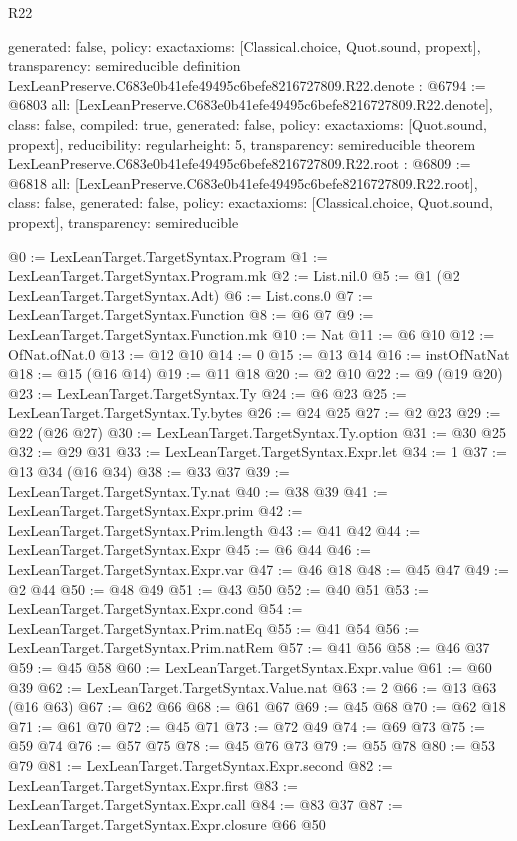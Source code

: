\begin{lexlean}{R22}
\begin{coremodule}
{  generated: false,
  policy: exact{axioms: [Classical.choice, Quot.sound, propext]},
  transparency: semireducible
}
definition LexLeanPreserve.C683e0b41efe49495c6befe8216727809.R22.denote : @6794 := @6803 {
  all: [LexLeanPreserve.C683e0b41efe49495c6befe8216727809.R22.denote],
  class: false,
  compiled: true,
  generated: false,
  policy: exact{axioms: [Quot.sound, propext]},
  reducibility: regular{height: 5},
  transparency: semireducible
}
theorem LexLeanPreserve.C683e0b41efe49495c6befe8216727809.R22.root : @6809 := @6818 {
  all: [LexLeanPreserve.C683e0b41efe49495c6befe8216727809.R22.root],
  class: false,
  generated: false,
  policy: exact{axioms: [Classical.choice, Quot.sound, propext]},
  transparency: semireducible
}

@0 := LexLeanTarget.TargetSyntax.Program
@1 := LexLeanTarget.TargetSyntax.Program.mk
@2 := List.nil.{0}
@5 := @1 (@2 LexLeanTarget.TargetSyntax.Adt)
@6 := List.cons.{0}
@7 := LexLeanTarget.TargetSyntax.Function
@8 := @6 @7
@9 := LexLeanTarget.TargetSyntax.Function.mk
@10 := Nat
@11 := @6 @10
@12 := OfNat.ofNat.{0}
@13 := @12 @10
@14 := 0
@15 := @13 @14
@16 := instOfNatNat
@18 := @15 (@16 @14)
@19 := @11 @18
@20 := @2 @10
@22 := @9 (@19 @20)
@23 := LexLeanTarget.TargetSyntax.Ty
@24 := @6 @23
@25 := LexLeanTarget.TargetSyntax.Ty.bytes
@26 := @24 @25
@27 := @2 @23
@29 := @22 (@26 @27)
@30 := LexLeanTarget.TargetSyntax.Ty.option
@31 := @30 @25
@32 := @29 @31
@33 := LexLeanTarget.TargetSyntax.Expr.let
@34 := 1
@37 := @13 @34 (@16 @34)
@38 := @33 @37
@39 := LexLeanTarget.TargetSyntax.Ty.nat
@40 := @38 @39
@41 := LexLeanTarget.TargetSyntax.Expr.prim
@42 := LexLeanTarget.TargetSyntax.Prim.length
@43 := @41 @42
@44 := LexLeanTarget.TargetSyntax.Expr
@45 := @6 @44
@46 := LexLeanTarget.TargetSyntax.Expr.var
@47 := @46 @18
@48 := @45 @47
@49 := @2 @44
@50 := @48 @49
@51 := @43 @50
@52 := @40 @51
@53 := LexLeanTarget.TargetSyntax.Expr.cond
@54 := LexLeanTarget.TargetSyntax.Prim.natEq
@55 := @41 @54
@56 := LexLeanTarget.TargetSyntax.Prim.natRem
@57 := @41 @56
@58 := @46 @37
@59 := @45 @58
@60 := LexLeanTarget.TargetSyntax.Expr.value
@61 := @60 @39
@62 := LexLeanTarget.TargetSyntax.Value.nat
@63 := 2
@66 := @13 @63 (@16 @63)
@67 := @62 @66
@68 := @61 @67
@69 := @45 @68
@70 := @62 @18
@71 := @61 @70
@72 := @45 @71
@73 := @72 @49
@74 := @69 @73
@75 := @59 @74
@76 := @57 @75
@78 := @45 @76 @73
@79 := @55 @78
@80 := @53 @79
@81 := LexLeanTarget.TargetSyntax.Expr.second
@82 := LexLeanTarget.TargetSyntax.Expr.first
@83 := LexLeanTarget.TargetSyntax.Expr.call
@84 := @83 @37
@87 := LexLeanTarget.TargetSyntax.Expr.closure @66 @50

\end{coremodule}
\end{lexlean}
